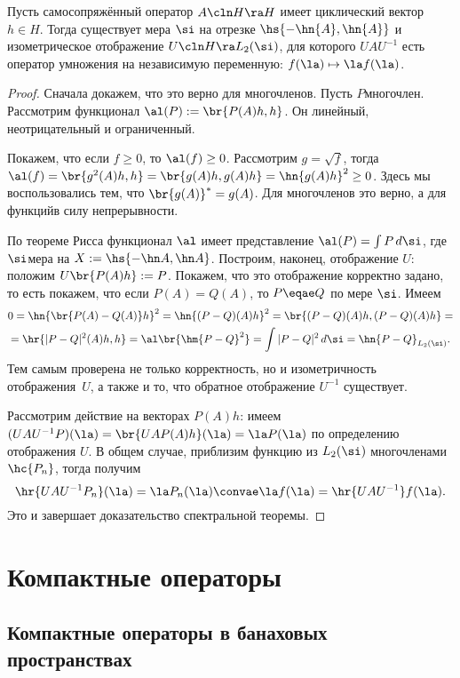 \documentclass[a4paper]{article}
\begin{document}
\begin{theorem}
Пусть самосопряжённый оператор $A\cln H \ra H$ имеет циклический вектор $h\in H$.
Тогда существует мера $\si$ на отрезке $\hs{-\hn{A}, \hn{A}}$ и изометрическое отображение
$U\cln H \ra L_2(\si)$, для которого
$UAU^{-1}$ есть оператор умножения на независимую переменную: $f(\la) \mapsto \la f(\la)$.
\end{theorem}
\begin{proof}
Сначала докажем, что это верно для многочленов.
Пусть $P$\т многочлен. Рассмотрим функционал
$\al(P):= \br{P(A)h,h}$. Он линейный, неотрицательный и ограниченный.

Покажем, что если $f \ge 0$, то $\al(f) \ge 0$.
Рассмотрим $g = \sqrt{f}$, тогда $\al(f) = \br{g^2(A)h,h} = \br{g(A)h,g(A)h} = \hn{g(A)h}^2 \ge 0$.
Здесь мы воспользовались тем, что $\br{g(A)}^* = g(A)$. Для многочленов это верно, а для функций\т в силу непрерывности.

По теореме Рисса функционал $\al$ имеет представление $\al(P) = \int P\,d\si$, где
$\si$\т мера на $X := \hs{-\hn A, \hn A}$. Построим, наконец, отображение $U$: положим
$U\br{P(A)h} := P$.
Покажем, что это отображение корректно задано, то есть покажем, что если $P(A) = Q(A)$, то $P \eqae Q$ по мере $\si$.
Имеем
\begin{multline*}
0 = \hn{\br{P(A)-Q(A)}h}^2 = \hn{(P-Q)(A)h}^2 = \br{(P-Q)(A)h, (P-Q)(A)h} =\\=
\hr{|P-Q|^2(A)h,h} = \al\br{\hm{P-Q}^2}=\int|P-Q|^2\,d\si = \hn{P-Q}_{L_2(\si)}.
\end{multline*}
Тем самым проверена не только корректность, но и изометричность отображения~$U$,
а также и то, что обратное отображение $U^{-1}$ существует.

Рассмотрим действие на векторах $P(A)h$: имеем
$(UAU^{-1} P)(\la) = \br{UAP(A)h}(\la) = \la P(\la)$ по определению отображения $U$.
В общем случае, приблизим функцию из $L_2(\si)$ многочленами $\hc{P_n}$, тогда получим
$$\hr{UAU^{-1}P_n}(\la) = \la P_n(\la) \convae \la f(\la) = \hr{UAU^{-1}}f(\la).$$
Это и завершает доказательство спектральной теоремы.
\end{proof}

\section{Компактные операторы}

\subsection{Компактные операторы в банаховых пространствах}
\end{document}
